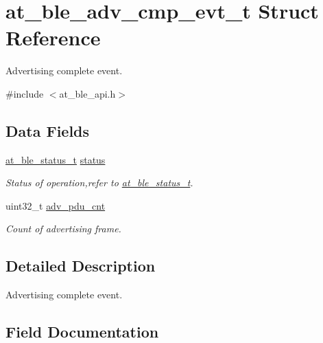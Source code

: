 \hypertarget{structat__ble__adv__cmp__evt__t}{}\section{at\+\_\+ble\+\_\+adv\+\_\+cmp\+\_\+evt\+\_\+t Struct Reference}
\label{structat__ble__adv__cmp__evt__t}


Advertising complete event.  




{\ttfamily \#include $<$at\+\_\+ble\+\_\+api.\+h$>$}

\subsection*{Data Fields}
\begin{DoxyCompactItemize}
\item 
\mbox{\hyperlink{group__error__codes__group_ga3b1db9b95feb157b3c188ca27fe76988}{at\+\_\+ble\+\_\+status\+\_\+t}} \mbox{\hyperlink{structat__ble__adv__cmp__evt__t_a0b48093fc2030779fc47e5216f8019e2}{status}}
\begin{DoxyCompactList}\small\item\em Status of operation,refer to \mbox{\hyperlink{at__ble__api_8h_ace24eb4e5ca3f325c663b809da5feb92}{at\+\_\+ble\+\_\+status\+\_\+t}}. \end{DoxyCompactList}\item 
uint32\+\_\+t \mbox{\hyperlink{structat__ble__adv__cmp__evt__t_a25e11ab6b626c1b106878da5c435d8e4}{adv\+\_\+pdu\+\_\+cnt}}
\begin{DoxyCompactList}\small\item\em Count of advertising frame. \end{DoxyCompactList}\end{DoxyCompactItemize}


\subsection{Detailed Description}
Advertising complete event. 

\subsection{Field Documentation}
\mbox{\label{structat__ble__adv__cmp__evt__t_a25e11ab6b626c1b106878da5c435d8e4}} 
